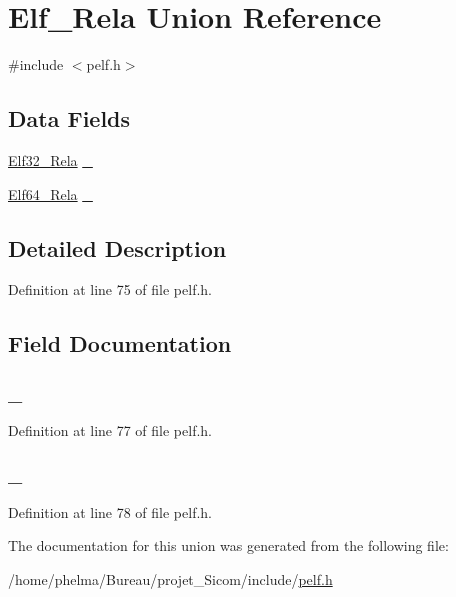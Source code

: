 \hypertarget{union_elf___rela}{\section{Elf\-\_\-\-Rela Union Reference}
\label{union_elf___rela}
}


{\ttfamily \#include $<$pelf.\-h$>$}

\subsection*{Data Fields}
\begin{DoxyCompactItemize}
\item 
\hyperlink{struct_elf32___rela}{Elf32\-\_\-\-Rela} \hyperlink{union_elf___rela_a7db2a75c38101f832e6814951dbdb4d8}{\-\_}
\item 
\hyperlink{struct_elf64___rela}{Elf64\-\_\-\-Rela} \hyperlink{union_elf___rela_a318ebcb8cd29c514304b583f65f97e70}{\-\_}
\end{DoxyCompactItemize}


\subsection{Detailed Description}


Definition at line 75 of file pelf.\-h.



\subsection{Field Documentation}
\hypertarget{union_elf___rela_a7db2a75c38101f832e6814951dbdb4d8}{
\subsubsection[{\-\_\-32}]{ \-\_}}\label{union_elf___rela_a7db2a75c38101f832e6814951dbdb4d8}


Definition at line 77 of file pelf.\-h.

\hypertarget{union_elf___rela_a318ebcb8cd29c514304b583f65f97e70}{
\subsubsection[{\-\_\-64}]{ \-\_}}\label{union_elf___rela_a318ebcb8cd29c514304b583f65f97e70}


Definition at line 78 of file pelf.\-h.



The documentation for this union was generated from the following file\-:\begin{DoxyCompactItemize}
\item 
/home/phelma/\-Bureau/projet\-\_\-\-Sicom/include/\hyperlink{pelf_8h}{pelf.\-h}\end{DoxyCompactItemize}
